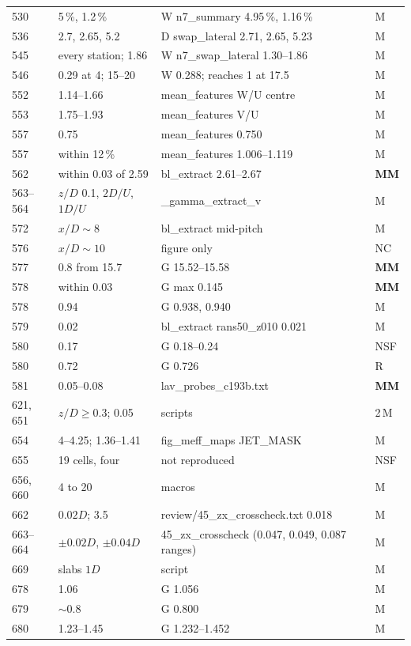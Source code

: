 \documentclass[10pt,a4paper]{article}
\newcommand{\vM}{\textsf{M}}
\newcommand{\vR}{\textsf{R}}
\newcommand{\vMM}{\textbf{\textsf{MM}}}
\newcommand{\vNSF}{\textsf{NSF}}
\newcommand{\vNC}{\textsf{NC}}
\begin{document}
{\begin{longtable}{@{}P{15mm} P{58mm} P{75mm} P{10mm}@{}}
530 & 5\,\%, 1.2\,\% & W n7\_summary 4.95\,\%, 1.16\,\% & \vM \\
536 & 2.7, 2.65, 5.2 & D swap\_lateral 2.71, 2.65, 5.23 & \vM \\
545 & every station; 1.86 & W n7\_swap\_lateral 1.30--1.86 & \vM \\
546 & 0.29 at 4; 15--20 & W 0.288; reaches 1 at 17.5 & \vM \\
552 & 1.14--1.66 & mean\_features W/U centre & \vM \\
553 & 1.75--1.93 & mean\_features V/U & \vM \\
557 & 0.75 & mean\_features 0.750 & \vM \\
557 & within 12\,\% & mean\_features 1.006--1.119 & \vM \\
562 & within 0.03 of 2.59 & bl\_extract 2.61--2.67 & \vMM \\
563--564 & $z/D$ 0.1, $2D/U$, $1D/U$ & \_gamma\_extract\_v & \vM \\
572 & $x/D\sim8$ & bl\_extract mid-pitch & \vM \\
576 & $x/D\sim10$ & figure only & \vNC \\
577 & 0.8 from 15.7 & G 15.52--15.58 & \vMM \\
578 & within 0.03 & G max 0.145 & \vMM \\
578 & 0.94 & G 0.938, 0.940 & \vM \\
579 & 0.02 & bl\_extract rans50\_z010 0.021 & \vM \\
580 & 0.17 & G 0.18--0.24 & \vNSF \\
580 & 0.72 & G 0.726 & \vR \\
581 & 0.05--0.08 & lav\_probes\_c193b.txt & \vMM \\
621, 651 & $z/D\ge0.3$; 0.05 & scripts & 2\,\vM \\
654 & 4--4.25; 1.36--1.41 & fig\_meff\_maps JET\_MASK & \vM \\
655 & 19 cells, four & not reproduced & \vNSF \\
656, 660 & 4 to 20 & macros & \vM \\
662 & $0.02D$; 3.5 & review/45\_zx\_crosscheck.txt 0.018 & \vM \\
663--664 & $\pm0.02D$, $\pm0.04D$ & 45\_zx\_crosscheck (0.047, 0.049, 0.087 ranges) & \vM \\
669 & slabs $1D$ & script & \vM \\
678 & 1.06 & G 1.056 & \vM \\
679 & $\sim$0.8 & G 0.800 & \vM \\
680 & 1.23--1.45 & G 1.232--1.452 & \vM \\

\end{longtable}}
\end{document}

